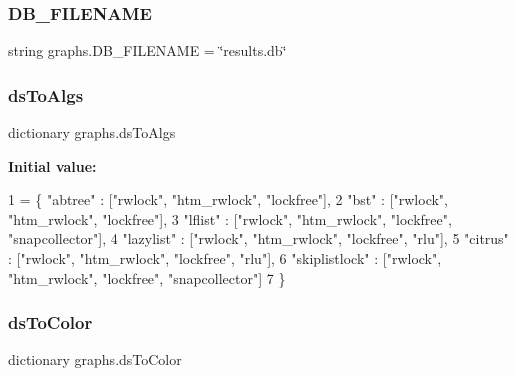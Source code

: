 \subsubsection{\texorpdfstring{D\+B\+\_\+\+F\+I\+L\+E\+N\+A\+ME}{DB\_FILENAME}}
{\footnotesize\ttfamily string graphs.\+D\+B\+\_\+\+F\+I\+L\+E\+N\+A\+ME = \char`\"{}results.\+db\char`\"{}}

\mbox{\label{namespacegraphs_ad2e7ee345c905ffd361a1d15685eb4e2}} 
\subsubsection{\texorpdfstring{ds\+To\+Algs}{dsToAlgs}}
{\footnotesize\ttfamily dictionary graphs.\+ds\+To\+Algs}

{\bfseries Initial value\+:}
\begin{DoxyCode}
1 =  \{ \textcolor{stringliteral}{"abtree"} :         [\textcolor{stringliteral}{"rwlock"}, \textcolor{stringliteral}{"htm\_rwlock"}, \textcolor{stringliteral}{"lockfree"}],
2              \textcolor{stringliteral}{"bst"} :            [\textcolor{stringliteral}{"rwlock"}, \textcolor{stringliteral}{"htm\_rwlock"}, \textcolor{stringliteral}{"lockfree"}],
3              \textcolor{stringliteral}{"lflist"} :         [\textcolor{stringliteral}{"rwlock"}, \textcolor{stringliteral}{"htm\_rwlock"}, \textcolor{stringliteral}{"lockfree"}, \textcolor{stringliteral}{"snapcollector"}],
4              \textcolor{stringliteral}{"lazylist"} :       [\textcolor{stringliteral}{"rwlock"}, \textcolor{stringliteral}{"htm\_rwlock"}, \textcolor{stringliteral}{"lockfree"}, \textcolor{stringliteral}{"rlu"}],
5              \textcolor{stringliteral}{"citrus"} :         [\textcolor{stringliteral}{"rwlock"}, \textcolor{stringliteral}{"htm\_rwlock"}, \textcolor{stringliteral}{"lockfree"}, \textcolor{stringliteral}{"rlu"}],
6              \textcolor{stringliteral}{"skiplistlock"} :   [\textcolor{stringliteral}{"rwlock"}, \textcolor{stringliteral}{"htm\_rwlock"}, \textcolor{stringliteral}{"lockfree"}, \textcolor{stringliteral}{"snapcollector"}]
7             \}
\end{DoxyCode}
\mbox{\label{namespacegraphs_ac9d1b897f7ba900fa4347ea130716447}} 
\subsubsection{\texorpdfstring{ds\+To\+Color}{dsToColor}}
{\footnotesize\ttfamily dictionary graphs.\+ds\+To\+Color}

